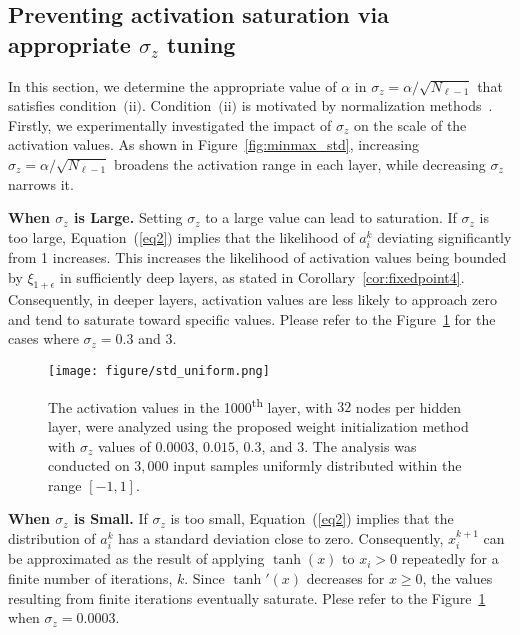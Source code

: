 \documentclass{article} \usepackage{iclr2025_conference,times}
\begin{document}
\subsection{Preventing activation saturation via appropriate $\sigma_z$ tuning}\label{3.3}
In this section, we determine the appropriate value of \( \alpha \) in \( \sigma_z = \alpha / \sqrt{N_{\ell-1}} \) that satisfies condition~$($ii$)$. Condition~$($ii$)$ is motivated by normalization methods~\citep{ioffe2015batch, ba2016layer}. Firstly, we experimentally investigated the impact of $\sigma_z$ on the scale of the activation values. As shown in Figure~\ref{fig:minmax_std}, increasing \( \sigma_z = \alpha/\sqrt{N_{\ell-1}} \) broadens the activation range in each layer, while decreasing \( \sigma_z \) narrows it.

\textbf{When $\sigma_z$ is Large.} Setting $\sigma_z$ to a large value can lead to saturation. 
If \( \sigma_z \) is too large, Equation~(\ref{eq2}) implies that the likelihood of \( a_i^k \) deviating significantly from 1 increases.
This increases the likelihood of activation values being bounded by \( \xi_{1+\epsilon} \) in sufficiently deep layers, as stated in Corollary~\ref{cor:fixedpoint4}. Consequently, in deeper layers, activation values are less likely to approach zero and tend to saturate toward specific values. Please refer to the Figure~\ref{std_normal} for the cases where $\sigma_z = 0.3$ and $3$.



\begin{figure}[t!]
\centering
\texttt{[image: figure/std\_uniform.png]}
\caption{The activation values in the 1000\textsuperscript{th} layer, with $32$ nodes per hidden layer, were analyzed using the proposed weight initialization method with $\sigma_z$ values of $0.0003$, $0.015$, $0.3$, and $3$. The analysis was conducted on $3,000$ input samples uniformly distributed within the range $[-1, 1]$.}
\label{std_normal}
\end{figure}

\textbf{When $\sigma_z$ is Small.} 
If \( \sigma_z \) is too small, Equation~(\ref{eq2}) implies that the distribution of \( a_i^k \) has a standard deviation close to zero. Consequently, \( x_i^{k+1} \) can be approximated as the result of applying \( \tanh(x) \) to \( x_i>0 \) repeatedly for a finite number of iterations, \( k \). Since \( \tanh'(x) \) decreases for \( x \geq 0 \), the values resulting from finite iterations eventually saturate.
Plese refer to the Figure~\ref{std_normal} when $\sigma_z = 0.0003$.
\end{document}
